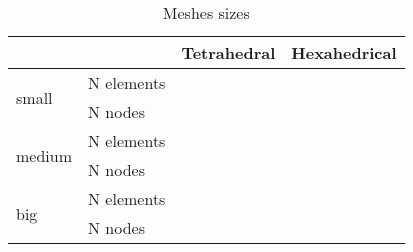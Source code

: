 \documentclass{anstrans}
\begin{document}
\begin{table}[]
\centering
\caption{Meshes sizes}
\label{tab:sizes}
\begin{tabular}{@{}llll@{}}
\toprule
                        &            & Tetrahedral & Hexahedrical \\ \midrule
\multirow{2}{*}{small}  & N elements &               &              \\
                        & N nodes    &               &              \\
\multirow{2}{*}{medium} & N elements &               &              \\
                        & N nodes    &               &              \\
\multirow{2}{*}{big}    & N elements &               &              \\
                        & N nodes    &               &              \\ \cmidrule(l){2-4} 
\end{tabular}
\end{table}




\end{document}
